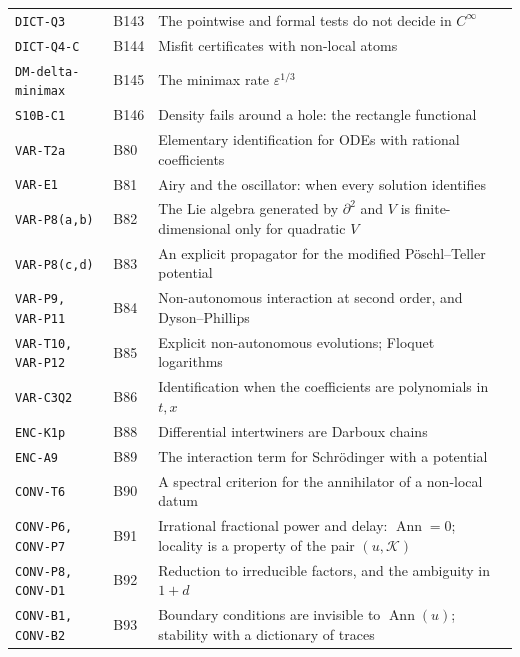\documentclass[11pt,a4paper,oneside]{report}
\newcommand{\Ann}{\operatorname{Ann}}
\begin{document}
\begin{center}
\begin{longtable}{@{}L{3.6cm}L{1.2cm}L{8.0cm}L{1.2cm}@{}}
\texttt{DICT-Q3} & B143 & The pointwise and formal tests do not decide in $C^\infty$ & \pageref{dim:DICT-Q3}\\
\texttt{DICT-Q4-C} & B144 & Misfit certificates with non-local atoms & \pageref{dim:DICT-Q4-C}\\
\texttt{DM-delta-minimax} & B145 & The minimax rate $\varepsilon^{1/3}$ & \pageref{dim:DM-delta-minimax}\\
\texttt{S10B-C1} & B146 & Density fails around a hole: the rectangle functional & \pageref{dim:S10B-C1}\\
\texttt{VAR-T2a} & B80 & Elementary identification for ODEs with rational coefficients & \pageref{dim:VAR-T2a}\\
\texttt{VAR-E1} & B81 & Airy and the oscillator: when every solution identifies & \pageref{dim:VAR-E1}\\
\texttt{VAR-P8(a,b)} & B82 & The Lie algebra generated by $\partial^2$ and $V$ is finite-dimensional only for quadratic $V$ & \pageref{dim:VAR-P8(a,b)}\\
\texttt{VAR-P8(c,d)} & B83 & An explicit propagator for the modified P\"oschl--Teller potential & \pageref{dim:VAR-P8(c,d)}\\
\texttt{VAR-P9, VAR-P11} & B84 & Non-autonomous interaction at second order, and Dyson--Phillips & \pageref{dim:VAR-P9, VAR-P11}\\
\texttt{VAR-T10, VAR-P12} & B85 & Explicit non-autonomous evolutions; Floquet logarithms & \pageref{dim:VAR-T10, VAR-P12}\\
\texttt{VAR-C3Q2} & B86 & Identification when the coefficients are polynomials in $t,x$ & \pageref{dim:VAR-C3Q2}\\
\texttt{ENC-K1p} & B88 & Differential intertwiners are Darboux chains & \pageref{dim:ENC-K1p}\\
\texttt{ENC-A9} & B89 & The interaction term for Schr\"odinger with a potential & \pageref{dim:ENC-A9}\\
\texttt{CONV-T6} & B90 & A spectral criterion for the annihilator of a non-local datum & \pageref{dim:CONV-T6}\\
\texttt{CONV-P6, CONV-P7} & B91 & Irrational fractional power and delay: $\Ann=0$; locality is a property of the pair $(u,\mathcal K)$ & \pageref{dim:CONV-P6, CONV-P7}\\
\texttt{CONV-P8, CONV-D1} & B92 & Reduction to irreducible factors, and the ambiguity in $1+d$ & \pageref{dim:CONV-P8, CONV-D1}\\
\texttt{CONV-B1, CONV-B2} & B93 & Boundary conditions are invisible to $\Ann(u)$; stability with a dictionary of traces & \pageref{dim:CONV-B1, CONV-B2}\\

\end{longtable}
\end{center}
\end{document}
